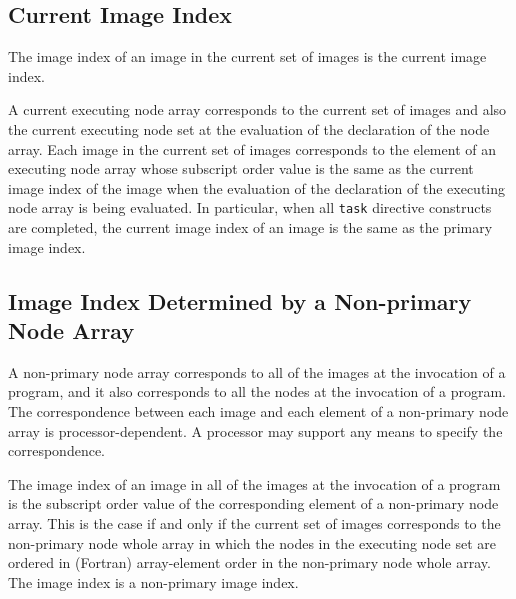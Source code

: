 \subsection{Current Image Index}

The image index of an image in the current set of images is
the current image index.

A current executing node array corresponds to the 
current set of images and also the current executing node set 
at the evaluation of the declaration of the node array.
Each image in the current set of images corresponds 
to the element of an executing node array whose
subscript order value is the same as the current image index
of the image when the evaluation of the declaration of the executing
node array is being evaluated.
In particular, when all {\tt task} directive constructs are 
completed, the current image index of an image is the same as the
primary image index.



\subsection{Image Index Determined by a Non-primary Node Array}


A non-primary node array corresponds to all of the images at the
invocation of a program, and it also corresponds to all the nodes at the
invocation of 
a program. The correspondence between each image and 
each element of a non-primary node array is processor-dependent.
A processor may support any means to specify the correspondence.

The image index of an image in all of the images at the invocation 
of a program is the subscript order value of the corresponding element
of a non-primary node array. This is the case if and only if the current
set of images 
corresponds to the non-primary node whole array in which
the nodes in the executing node set are ordered in (Fortran)
array-element order in the non-primary node whole array.
The image index is a non-primary image index. 

